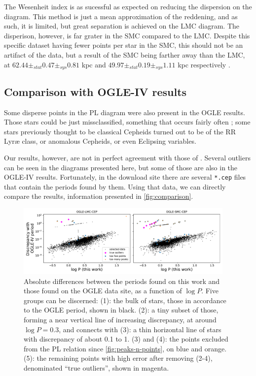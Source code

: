 The Wesenheit index is as sucessful as expected on reducing the dispersion on the diagram.
This method is just a mean approximation of the reddening, and as such, it is limited, but great separation is achieved on the LMC diagram.
The disperison, however, is far grater in the SMC compared to the LMC. 
Despite this specific dataset having fewer points per star in the SMC, this should not be an artifact of the data, 
but a result of the SMC being farther away than the LMC, at $62.44 \pm_{stat} 0.47 \pm_{sys}0.81$ kpc 
and $49.97 \pm_{stat} 0.19 \pm_{sys} 1.11$ kpc respectively \citep{SMC2020,LMC2013}.

\subsection{Comparison with OGLE-IV results}


Some disperse points in the PL diagram were also present in the OGLE results. 
Those stars could be just missclassified, something that occurs fairly often \citep[see for example Table 1 of][]{OGLE2016};
some stars previously thought to be classical Cepheids turned out to be of the RR Lyr\ae{} class,
or anomalous Cepheids, or even Eclipsing variables.

Our results, however, are not in perfect agreement with those of \cite{OGLE2016}.
Several outliers can be seen in the diagrams presented here, but some of those are also in the OGLE-IV results.
Fortunately, in the download site there are several \texttt{*.cep} files that contain the periods found by them.
Using that data, we can directly compare the results, information presented in \autoref{fig:comparison}.

\begin{figure}
	\centering
	\includegraphics[width=0.95\textwidth]{img/discrepancies.pdf}
	\caption[Results: comparison with OGLE-IV periods]{
		Absolute differences between the periods found on this work and those found on the OGLE data site, as a function of $\log P$.
		Five groups can be discerned: (1): the bulk of stars, those in accordance to the OGLE period, shown in black. 
		(2): a tiny subset of those, forming a near vertical line of increasing discrepancy, at around  $\log P = 0.3$, and connects with
		(3): a thin horizontal line of stars with discrepancy of about 0.1 to 1.
		(3) and (4): the points excluded from the PL relation since \autoref{fig:peaks-n-points}, on blue and orange.
		(5): the remaining points with high error after removing (2-4), denominated \enquote{true outliers}, shown in magenta.
	}
	\label{fig:comparison}
\end{figure}


